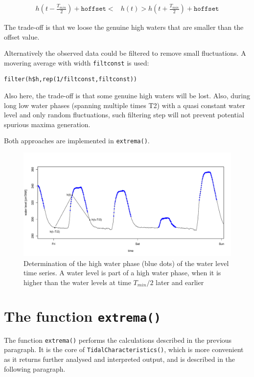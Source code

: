 \documentclass[10pt,a4wide]{article}
\begin{document}
\begin{align}
h(t-\frac{T_{min}}{2}) + \texttt{hoffset}   < 	&h(t) >   h(t+\frac{T_{min}}{2}) + \texttt{hoffset}
\end{align}

The trade-off is that we loose the genuine high waters that are smaller than the offset value.

Alternatively the observed data could be filtered to remove small fluctuations. A movering average with width \texttt{filtconst} is used: \begin{verbatim}filter(h$h,rep(1/filtconst,filtconst))\end{verbatim}

Also here, the trade-off is that some genuine high waters will be lost. Also, during long low water phases  (spanning multiple times T2) with a quasi constant water level and only random fluctuations, such filtering step will not prevent potential spurious maxima generation.

Both approaches are implemented in \texttt{extrema()}.

\begin{figure}[h]
\begin{center}
\includegraphics{Tides-TideFig2}

\end{center}
\caption{Determination of the high water phase (blue dots) of the water level time series. A water level is part of a high water phase, when it is higher than the water levels at time $T_{min}/2$ later and earlier} 
\label{Fig2}
\end{figure}




\section{The function \texttt{extrema()}}
The function \texttt{extrema()} performs the calculations described in the previous paragraph. It is the core of \texttt{TidalCharacteristics()}, which is more convenient as it returns further analysed and interpreted output, and is described in the following paragraph. 
\end{document}
